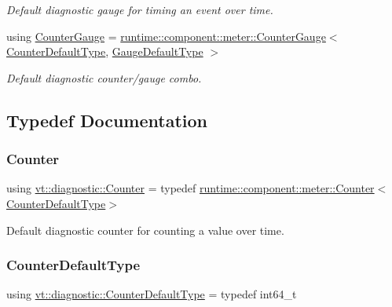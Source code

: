 \begin{DoxyCompactItemize}
\begin{DoxyCompactList}\small\item\em Default diagnostic gauge for timing an event over time. \end{DoxyCompactList}\item 
using \hyperlink{namespacevt_1_1diagnostic_a95e27dc4e2a74cef48e2cf82a3c5cb36}{Counter\+Gauge} = \hyperlink{structvt_1_1runtime_1_1component_1_1meter_1_1_counter_gauge}{runtime\+::component\+::meter\+::\+Counter\+Gauge}$<$ \hyperlink{namespacevt_1_1diagnostic_a23927eac6cae6ec4babd7b8437f163f1}{Counter\+Default\+Type}, \hyperlink{namespacevt_1_1diagnostic_a32500a7e9e4ef4618d0084987ea40a8c}{Gauge\+Default\+Type} $>$
\begin{DoxyCompactList}\small\item\em Default diagnostic counter/gauge combo. \end{DoxyCompactList}\end{DoxyCompactItemize}


\subsection{Typedef Documentation}
\mbox{\label{namespacevt_1_1diagnostic_a55fcc9d6ffa285d1b085c01df2507d2f}} 
\subsubsection{\texorpdfstring{Counter}{Counter}}
{\footnotesize\ttfamily using \hyperlink{namespacevt_1_1diagnostic_a55fcc9d6ffa285d1b085c01df2507d2f}{vt\+::diagnostic\+::\+Counter} = typedef \hyperlink{structvt_1_1runtime_1_1component_1_1meter_1_1_counter}{runtime\+::component\+::meter\+::\+Counter}$<$\hyperlink{namespacevt_1_1diagnostic_a23927eac6cae6ec4babd7b8437f163f1}{Counter\+Default\+Type}$>$}



Default diagnostic counter for counting a value over time. 

\mbox{\label{namespacevt_1_1diagnostic_a23927eac6cae6ec4babd7b8437f163f1}} 
\subsubsection{\texorpdfstring{Counter\+Default\+Type}{CounterDefaultType}}
{\footnotesize\ttfamily using \hyperlink{namespacevt_1_1diagnostic_a23927eac6cae6ec4babd7b8437f163f1}{vt\+::diagnostic\+::\+Counter\+Default\+Type} = typedef int64\+\_\+t}



